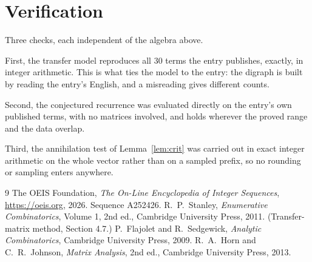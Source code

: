 \documentclass[11pt,a4paper]{article}
\theoremstyle{plain}
\theoremstyle{definition}
\begin{document}
\section{Verification}

Three checks, each independent of the algebra above.

First, the transfer model reproduces all $30$ terms the entry publishes, exactly, in
integer arithmetic. This is what ties the model to the entry: the digraph is built by reading
the entry's English, and a misreading gives different counts.

Second, the conjectured recurrence was evaluated directly on the entry's own published terms,
with no matrices involved, and holds wherever the proved range and the data overlap.

Third, the annihilation test of Lemma~\ref{lem:crit} was carried out in exact integer
arithmetic on the whole vector rather than on a sampled prefix, so no rounding or sampling
enters anywhere.

\begin{thebibliography}{9}
 The OEIS Foundation, \emph{The On-Line Encyclopedia of Integer
Sequences}, \url{https://oeis.org}, 2026. Sequence A252426.
 R.~P.~Stanley, \emph{Enumerative Combinatorics}, Volume 1, 2nd ed.,
Cambridge University Press, 2011. (Transfer-matrix method, Section 4.7.)
 P.~Flajolet and R.~Sedgewick, \emph{Analytic Combinatorics}, Cambridge
University Press, 2009.
 R.~A.~Horn and C.~R.~Johnson, \emph{Matrix Analysis}, 2nd ed., Cambridge
University Press, 2013.
\end{thebibliography}
\end{document}
